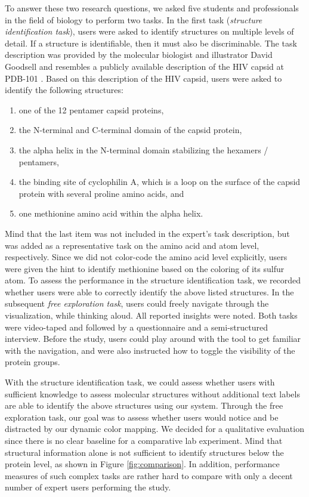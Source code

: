 \documentclass{egpubl}
\begin{document}
	To answer these two research questions, we asked five students and professionals in the field of biology to perform two tasks. 
	In the first task (\emph{structure identification task}), users were asked to identify structures on multiple levels of detail.
	If a structure is identifiable, then it must also be discriminable. 
	The task description was provided by the molecular biologist and illustrator David Goodsell and resembles a publicly available description of the HIV capsid at PDB-101 \cite{goodsell2016}.
	Based on this description of the HIV capsid, users were asked to identify the following structures: 
	\begin{enumerate}
		\itemsep0em 
		\item one of the 12 pentamer capsid proteins, 
		\item the N-terminal and C-terminal domain of the capsid protein, 
		\item the alpha helix in the N-terminal domain stabilizing the hexamers / pentamers, 
		\item the binding site of cyclophilin A, which is a loop on the surface of the capsid protein with several proline amino acids, and
		\item one methionine amino acid within the alpha helix.
	\end{enumerate}
	Mind that the last item was not included in the expert's task description, but was added as a representative task on the amino acid and atom level, respectively. 
	Since we did not color-code the amino acid level explicitly, users were given the hint to identify methionine based on the coloring of its sulfur atom. 
	To assess the performance in the structure identification task, we recorded whether users were able to correctly identify the above listed structures. 
	In the subsequent \emph{free exploration task}, users could freely navigate through the visualization, while thinking aloud. 
	All reported insights were noted. 
	Both tasks were video-taped and followed by a questionnaire and a semi-structured interview. 
	Before the study, users could play around with the tool to get familiar with the navigation, and were also instructed how to toggle the visibility of the protein groups. 
	
	With the structure identification task, we could assess whether users with sufficient knowledge to assess molecular structures without additional text labels are able to identify the above structures using our system. 
	Through the free exploration task, our goal was to assess whether users would notice and be distracted by our dynamic color mapping. 
	We decided for a qualitative evaluation since there is no clear baseline for a comparative lab experiment. 
	Mind that structural information alone is not sufficient to identify structures below the protein level, as shown in Figure \ref{fig:comparison}. 
	In addition, performance measures of such complex tasks are rather hard to compare with only a decent number of expert users performing the study. 
	
\end{document}
